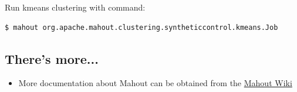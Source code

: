 Run kmeans clustering with command:
\lstset{style=bashstyle}
\begin{lstlisting}[language=bash]
$ mahout org.apache.mahout.clustering.syntheticcontrol.kmeans.Job
\end{lstlisting}

\subsection*{There's more...}
\begin{itemize}
  \item More documentation about Mahout can be obtained from the \href{https://cwiki.apache.org/confluence/display/MAHOUT/Mahout+Wiki}{Mahout Wiki}
\end{itemize}
